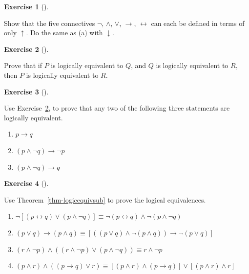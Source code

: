\documentclass[
  letterpaper,
  10pt,
  reqno,
  twopage,
  openany]{book}
\providecommand{\tightlist}{%
  \setlength{\itemsep}{0pt}\setlength{\parskip}{0pt}}\usepackage{longtable,booktabs,array}
\theoremstyle{plain}
\theoremstyle{definition}
\newtheorem{exercise}{Exercise}[chapter]
\theoremstyle{definition}
\theoremstyle{definition}
\theoremstyle{plain}
\theoremstyle{plain}
\theoremstyle{remark}
\begin{document}
\leavevmode{}%
\begin{exercise}[]\label{exr-26}

Show that the five connectives \(\neg\), \(\land\), \(\lor\),
\(\rightarrow\), \(\leftrightarrow\) can each be defined in terms of
only \(\uparrow\). Do the same as (a) with \(\downarrow\).

\end{exercise}

\leavevmode{}%
\begin{exercise}[]\label{exr-logequi}

Prove that if \(P\) is logically equivalent to \(Q\), and \(Q\) is
logically equivalent to \(R\), then \(P\) is logically equivalent to
\(R\).

\end{exercise}

\leavevmode{}%
\begin{exercise}[]\label{exr-27}

Use Exercise~\ref{exr-logequi}, to prove that any two of the following
three statements are logically equivalent.

\begin{enumerate}
\def\labelenumi{\arabic{enumi}.}
\tightlist
\item
  \(p\rightarrow q\)
\item
  \((p\land \neg q)\rightarrow \neg p\)
\item
  \((p\land \neg q)\rightarrow q\)
\end{enumerate}

\end{exercise}

\leavevmode{}%
\begin{exercise}[]\label{exr-28}

Use Theorem~\ref{thm-logicequivsub} to prove the logical equivalences.

\begin{enumerate}
\def\labelenumi{\arabic{enumi}.}
\tightlist
\item
  \(\neg[(p\leftrightarrow q)\lor (p\land \neg q)]\equiv \neg(p\leftrightarrow q)\land \neg(p\land \neg q)\)
\item
  \((p\lor q)\rightarrow (p\land q)\equiv [((p\lor q)\land \neg(p\land q))\rightarrow \neg(p\lor q)]\)
\item
  \((r\land \neg p)\land ((r\land \neg p)\lor (p\land \neg q))\equiv r\land \neg p\)
\item
  \((p\land r)\land ((p\rightarrow q)\lor r)\equiv [(p\land r)\land (p\rightarrow q)]\lor [(p\land r)\land r]\)
\end{enumerate}

\end{exercise}
\end{document}
